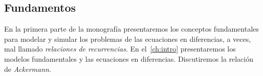 \begin{partbacktext}
	\part{Fundamentos}
	En la primera parte de la monografía presentaremos los conceptos fundamentales para modelar y simular los problemas de las ecuaciones en diferencias, a veces, mal llamado \emph{relaciones de recurrencias}. En el~\autoref{ch:intro} presentaremos los modelos fundamentales y las ecuaciones en diferencias. Discutiremos la relación de \emph{Ackermann}.
\end{partbacktext}
